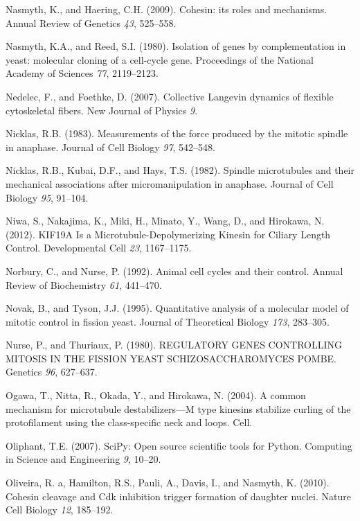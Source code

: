 \documentclass[12pt,a4paper,twoside,openright]{book}
\begin{document}
\hypertarget{ref-Nasmyth2009}{}
Nasmyth, K., and Haering, C.H. (2009). Cohesin: its roles and
mechanisms. Annual Review of Genetics \emph{43}, 525--558.

\hypertarget{ref-Nasmyth1980}{}
Nasmyth, K.A., and Reed, S.I. (1980). Isolation of genes by
complementation in yeast: molecular cloning of a cell-cycle gene.
Proceedings of the National Academy of Sciences \emph{77}, 2119--2123.

\hypertarget{ref-Nedelec2007}{}
Nedelec, F., and Foethke, D. (2007). Collective Langevin dynamics of
flexible cytoskeletal fibers. New Journal of Physics \emph{9}.

\hypertarget{ref-Nicklas1983}{}
Nicklas, R.B. (1983). Measurements of the force produced by the mitotic
spindle in anaphase. Journal of Cell Biology \emph{97}, 542--548.

\hypertarget{ref-Nicklas1982}{}
Nicklas, R.B., Kubai, D.F., and Hays, T.S. (1982). Spindle microtubules
and their mechanical associations after micromanipulation in anaphase.
Journal of Cell Biology \emph{95}, 91--104.

\hypertarget{ref-Niwa2012}{}
Niwa, S., Nakajima, K., Miki, H., Minato, Y., Wang, D., and Hirokawa, N.
(2012). KIF19A Is a Microtubule-Depolymerizing Kinesin for Ciliary
Length Control. Developmental Cell \emph{23}, 1167--1175.

\hypertarget{ref-Norbury1992}{}
Norbury, C., and Nurse, P. (1992). Animal cell cycles and their control.
Annual Review of Biochemistry \emph{61}, 441--470.

\hypertarget{ref-Novak1995}{}
Novak, B., and Tyson, J.J. (1995). Quantitative analysis of a molecular
model of mitotic control in fission yeast. Journal of Theoretical
Biology \emph{173}, 283--305.

\hypertarget{ref-Nurse1980}{}
Nurse, P., and Thuriaux, P. (1980). REGULATORY GENES CONTROLLING MITOSIS
IN THE FISSION YEAST SCHIZOSACCHAROMYCES POMBE. Genetics \emph{96},
627--637.

\hypertarget{ref-Ogawa2004}{}
Ogawa, T., Nitta, R., Okada, Y., and Hirokawa, N. (2004). A common
mechanism for microtubule destabilizers---M type kinesins stabilize
curling of the protofilament using the class-specific neck and loops.
Cell.

\hypertarget{ref-Oliphant2007}{}
Oliphant, T.E. (2007). SciPy: Open source scientific tools for Python.
Computing in Science and Engineering \emph{9}, 10--20.

\hypertarget{ref-Oliveira2010}{}
Oliveira, R. a, Hamilton, R.S., Pauli, A., Davis, I., and Nasmyth, K.
(2010). Cohesin cleavage and Cdk inhibition trigger formation of
daughter nuclei. Nature Cell Biology \emph{12}, 185--192.
\end{document}

